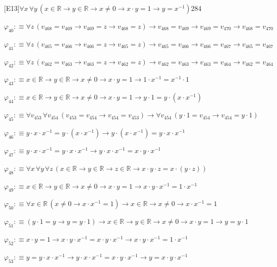 \begin{fullproof}{[E13]}{$\forall x\,\forall y\,(x \in \mathbb{R} \to y \in \mathbb{R} \to x \neq 0 \to x \cdot y = 1 \to y = x^{-1})$}{284}
\begin{abbrevlist}
\item $\varphi_{40} :\equiv \forall z\,(v_{468} = v_{469} \to v_{469} = z \to v_{468} = z) \to v_{468} = v_{469} \to v_{469} = v_{470} \to v_{468} = v_{470}$
\item $\varphi_{41} :\equiv \forall z\,(v_{465} = v_{466} \to v_{466} = z \to v_{465} = z) \to v_{465} = v_{466} \to v_{466} = v_{467} \to v_{465} = v_{467}$
\item $\varphi_{42} :\equiv \forall z\,(v_{462} = v_{463} \to v_{463} = z \to v_{462} = z) \to v_{462} = v_{463} \to v_{463} = v_{464} \to v_{462} = v_{464}$
\item $\varphi_{43} :\equiv x \in \mathbb{R} \to y \in \mathbb{R} \to x \neq 0 \to x \cdot y = 1 \to 1 \cdot x^{-1} = x^{-1} \cdot 1$
\item $\varphi_{44} :\equiv x \in \mathbb{R} \to y \in \mathbb{R} \to x \neq 0 \to x \cdot y = 1 \to y \cdot 1 = y \cdot (x \cdot x^{-1})$
\item $\varphi_{45} :\equiv \forall v_{453}\,\forall v_{454}\,(v_{453} = v_{454} \to v_{454} = v_{453}) \to \forall v_{454}\,(y \cdot 1 = v_{454} \to v_{454} = y \cdot 1)$
\item $\varphi_{46} :\equiv y \cdot x \cdot x^{-1} = y \cdot (x \cdot x^{-1}) \to y \cdot (x \cdot x^{-1}) = y \cdot x \cdot x^{-1}$
\item $\varphi_{47} :\equiv y \cdot x \cdot x^{-1} = y \cdot x \cdot x^{-1} \to y \cdot x \cdot x^{-1} = x \cdot y \cdot x^{-1}$
\item $\varphi_{48} :\equiv \forall x\,\forall y\,\forall z\,(x \in \mathbb{R} \to y \in \mathbb{R} \to z \in \mathbb{R} \to x \cdot y \cdot z = x \cdot (y \cdot z))$
\item $\varphi_{49} :\equiv x \in \mathbb{R} \to y \in \mathbb{R} \to x \neq 0 \to x \cdot y = 1 \to x \cdot y \cdot x^{-1} = 1 \cdot x^{-1}$
\item $\varphi_{50} :\equiv \forall x \in \mathbb{R}\,(x \neq 0 \to x \cdot x^{-1} = 1) \to x \in \mathbb{R} \to x \neq 0 \to x \cdot x^{-1} = 1$
\item $\varphi_{51} :\equiv (y \cdot 1 = y \to y = y \cdot 1) \to x \in \mathbb{R} \to y \in \mathbb{R} \to x \neq 0 \to x \cdot y = 1 \to y = y \cdot 1$
\item $\varphi_{52} :\equiv x \cdot y = 1 \to x \cdot y \cdot x^{-1} = x \cdot y \cdot x^{-1} \to x \cdot y \cdot x^{-1} = 1 \cdot x^{-1}$
\item $\varphi_{53} :\equiv y = y \cdot x \cdot x^{-1} \to y \cdot x \cdot x^{-1} = x \cdot y \cdot x^{-1} \to y = x \cdot y \cdot x^{-1}$

\end{abbrevlist}
\end{fullproof}

